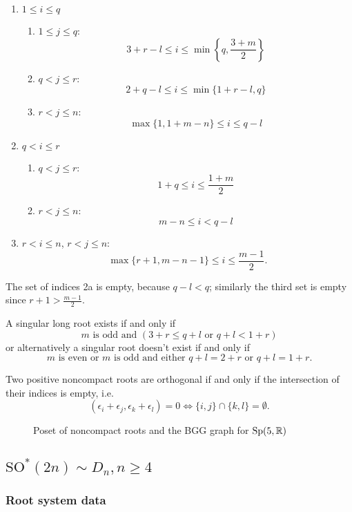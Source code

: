 \begin{enumerate}
  \item $1\leq i \leq q$
    \begin{enumerate}
      \item $1 \leq j \leq q$: \[ 3+r-l \leq i \leq \min \left\{ q, \frac{3+m}{2} \right \}\]
      \item $q < j \leq r$: \[ 2+q-l \leq i \leq \min \{ 1+r-l, q \}  \]
      \item $r < j \leq n$: \[ \max \{ 1, 1+m-n \} \leq i \leq q-l  \]
    \end{enumerate}
  \item $q <  i \leq r$
    \begin{enumerate}
      \item $q < j \leq r$: \[  1+q \leq i \leq \frac{1+m}{2} \]
      \item $r < j \leq n$: \[ m-n \leq i < q-l \]
    \end{enumerate}
  \item $r < i \leq n$, \quad $r < j \leq n$: \[ \max \{ r+1,  m-n-1 \} \leq i \leq \frac{m-1}{2}. \]
\end{enumerate}
The set of indices 2a is empty, because $q-l < q$; similarly the third set is empty since $r+1 > \frac{m-1}{2}$.

A singular long root exists if and only if
\[
  m \text{ is odd and } (3+r \leq q+l \text{ or } q+l < 1+r)
\]
or alternatively a singular root doesn't exist if and only if
\[
 m \text{ is even or } m \text{ is odd and either } q+l = 2+r \text{ or } q+l = 1+r.
\]


Two positive noncompact roots are orthogonal if and only if the intersection of their indices is empty, i.e.
\[
 (\epsilon_i + \epsilon_j,\epsilon_k + \epsilon_l) = 0 \Longleftrightarrow \{i,j\} \cap \{k,l\} = \emptyset.
\]


\begin{figure}[h]
  \centering 
  \resizebox{\textwidth}{!}{%
	
	}
  \caption{Poset of noncompact roots and the BGG graph for $\mathrm{Sp}(5,\mathbb{R})$}
\end{figure} 


\clearpage

\subsection[SO*(2n)]{$\mathrm{SO}^*(2n) \sim D_n, n\geq 4$}

\subsubsection{Root system data}

